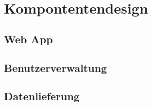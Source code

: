 \chapter{Kompontentendesign}

\section{Web App}

\section{Benutzerverwaltung}

\section{Datenlieferung}
